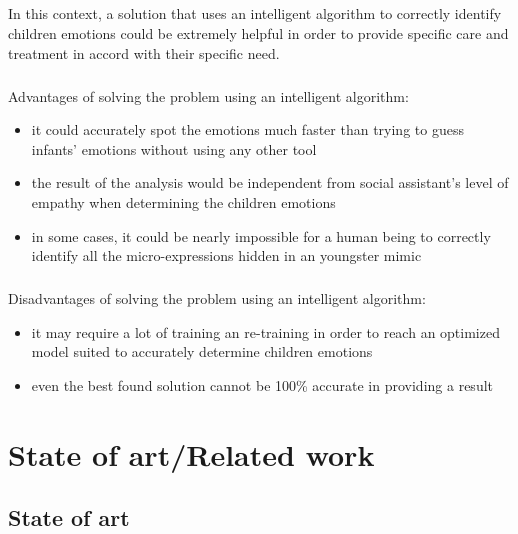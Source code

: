 \documentclass[runningheads,a4paper,11pt]{report}
\begin{document}
\paragraph{}
In this context, a solution that uses an intelligent algorithm to correctly identify children emotions could be extremely helpful in order to provide specific care and treatment in accord with their specific need.

\paragraph{}
Advantages of solving the problem using an intelligent algorithm:
\begin{itemize}
	\item it could accurately spot the emotions much faster than trying to guess infants' emotions without using any other tool
 	\item the result of the analysis would be independent from social assistant's level of empathy when determining the children emotions
 	\item in some cases, it could be nearly impossible for a human being to correctly identify all the micro-expressions hidden in an youngster mimic
\end{itemize}

\paragraph{}
Disadvantages of solving the problem using an intelligent algorithm:
\begin{itemize}
	\item it may require a lot of training an re-training in order to reach an optimized model suited to accurately determine children emotions
 	\item even the best found solution cannot be 100\% accurate in providing a result
\end{itemize}

\chapter{State of art/Related work}
\label{chapter:stateOfArt}
\section{State of art}
\end{document}
